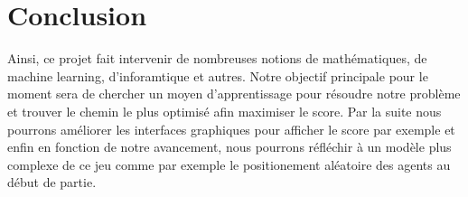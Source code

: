 \newpage
\section{Conclusion}

\vspace{1 cm}

Ainsi, ce projet fait intervenir de nombreuses notions de mathématiques, de machine learning, d'inforamtique et autres. Notre objectif principale pour le moment sera de chercher un moyen d'apprentissage pour résoudre notre problème et trouver le chemin le plus optimisé afin maximiser le score. Par la suite nous pourrons améliorer les interfaces graphiques pour afficher le score par exemple et enfin en fonction de notre avancement, nous pourrons réfléchir à un modèle plus complexe de ce jeu comme par exemple le positionement aléatoire des agents au début de partie.